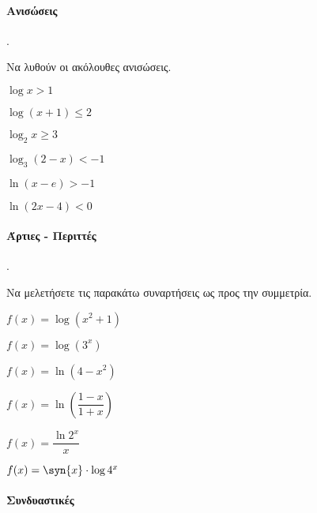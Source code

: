 \documentclass[11pt,a4paper,twocolumn]{article}
\newcounter{askhsh}
\newcommand{\askhsh}{\large\theaskhsh.\ \addtocounter{askhsh}{1}}
\begin{document}
\paragraph{Ανισώσεις}
\askhsh Να λυθούν οι ακόλουθες ανισώσεις.
\begin{multicols}{2}
\begin{alist}
\item $\log{x}>1$
\item $\log{(x+1)}\leq 2$
\item $\log_2{x}\geq 3$
\item $\log_3{(2-x)}<-1$
\item $\ln{(x-e)}>-1$
\item $\ln{(2x-4)}<0$
\end{alist}
\end{multicols}
\paragraph{Άρτιες - Περιττές}
\askhsh Να μελετήσετε τις παρακάτω συναρτήσεις ως προς την συμμετρία.
\begin{multicols}{2}
\begin{alist}[leftmargin=6mm]
\item $f(x)=\log{\left(x^2+1\right)}$
\item $f(x)=\log{\left(3^x\right)}$
\item $f(x)=\ln{(4-x^2)}$
\item $f(x)=\ln\left(\dfrac{1-x}{1+x}\right)$
\item $f(x)=\dfrac{\ln{2^x}}{x}$
\item $f(x)=\syn{x}\cdot\log{4^x}$
\end{alist}
\end{multicols}
\paragraph{Συνδυαστικές}
\end{document}

